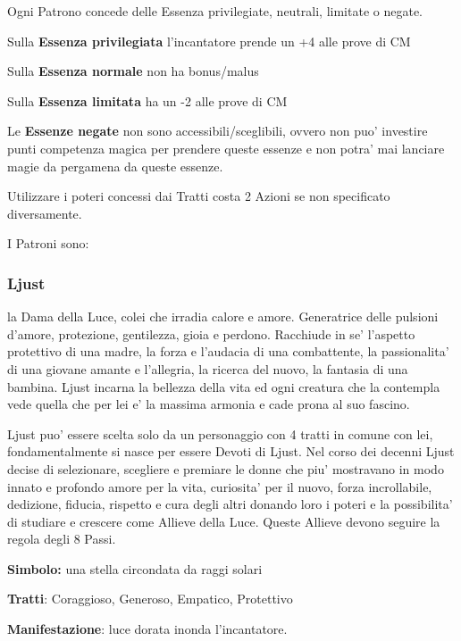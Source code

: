 \documentclass[a4paper,11pt,twoside,openany]{book}
\begin{document}
{		Ogni Patrono concede delle Essenza privilegiate, neutrali, limitate o negate.
		
		Sulla \textbf{Essenza privilegiata} l'incantatore prende un +4 alle prove di CM
		
		Sulla \textbf{Essenza normale} non ha bonus/malus
		
		Sulla \textbf{Essenza limitata} ha un -2 alle prove di CM
		
		Le \textbf{Essenze negate} non sono accessibili/sceglibili, ovvero non puo' investire punti competenza magica per prendere queste essenze e non potra' mai lanciare magie da pergamena da queste essenze.
		
		Utilizzare i poteri concessi dai Tratti costa 2 Azioni se non specificato diversamente.
		
		I Patroni sono:
		
		\subsubsection{Ljust}
		
		\label{ljust}
		
		la Dama della Luce, colei che irradia calore e amore. Generatrice delle pulsioni d'amore, protezione, gentilezza, gioia e perdono. Racchiude in se' l'aspetto protettivo di una madre, la forza e l'audacia di una combattente, la passionalita' di una giovane amante e l'allegria, la ricerca del nuovo, la fantasia di una bambina. Ljust incarna la bellezza della vita ed ogni creatura che la contempla vede quella che per lei e' la massima armonia e cade prona al suo fascino.
		
		Ljust puo' essere scelta solo da un personaggio con 4 tratti in comune con lei, fondamentalmente si nasce per essere Devoti di Ljust. Nel corso dei decenni Ljust decise di selezionare, scegliere e premiare le donne che piu' mostravano in modo innato e profondo amore per la vita, curiosita' per il nuovo, forza incrollabile, dedizione, fiducia, rispetto e cura degli altri donando loro i poteri e la possibilita' di studiare e crescere come Allieve della Luce. Queste Allieve devono seguire la regola degli 8 Passi.
		
		\textbf{Simbolo:} una stella circondata da raggi solari
		
		\textbf{Tratti}: Coraggioso, Generoso, Empatico, Protettivo
		
		\textbf{Manifestazione}: luce dorata inonda l'incantatore.
		
}
\end{document}
